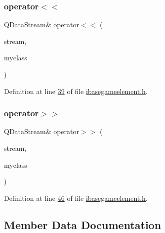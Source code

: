 \subsubsection{\texorpdfstring{operator$<$$<$}{operator<<}}
{\footnotesize\ttfamily Q\+Data\+Stream\& operator$<$$<$ (\begin{DoxyParamCaption}\item[{Q\+Data\+Stream \&}]{stream,  }\item[{const \hyperlink{a00137}{I\+Base\+Game\+Element} \&}]{myclass }\end{DoxyParamCaption})\hspace{0.3cm}{\ttfamily [friend]}}



Definition at line \hyperlink{a00047_source_l00039}{39} of file \hyperlink{a00047_source}{ibasegameelement.\+h}.

\mbox{\label{a00137_aed5ed6630f457a8cc55c01a605067300}} 
\subsubsection{\texorpdfstring{operator$>$$>$}{operator>>}}
{\footnotesize\ttfamily Q\+Data\+Stream\& operator$>$$>$ (\begin{DoxyParamCaption}\item[{Q\+Data\+Stream \&}]{stream,  }\item[{\hyperlink{a00137}{I\+Base\+Game\+Element} \&}]{myclass }\end{DoxyParamCaption})\hspace{0.3cm}{\ttfamily [friend]}}



Definition at line \hyperlink{a00047_source_l00046}{46} of file \hyperlink{a00047_source}{ibasegameelement.\+h}.



\subsection{Member Data Documentation}
\mbox{\label{a00137_a4d3547697d3bd0c2d65c83b07b3f8f91}} 
